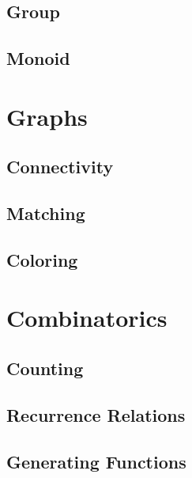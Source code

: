 \documentclass{book}
\begin{document}
\subsection{Group}
\subsection{Monoid}

\section {Graphs}
\subsection {Connectivity}
\subsection {Matching}
\subsection {Coloring}

\section {Combinatorics}
\subsection {Counting}
\subsection {Recurrence Relations}
\subsection {Generating Functions}
\end{document}
